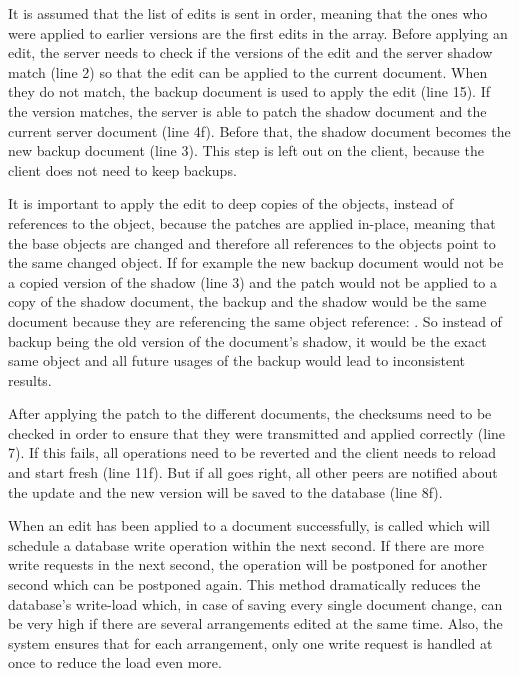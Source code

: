 It is assumed that the list of edits is sent in order, meaning that the ones who were applied to earlier versions are the first edits in the array. Before applying an edit, the server needs to check if the versions of the edit and the server shadow match (line 2) so that the edit can be applied to the current document. When they do not match, the backup document is used to apply the edit (line 15). If the version matches, the server is able to patch the shadow document and the current server document (line 4f). Before that, the shadow document becomes the new backup document (line 3). This step is left out on the client, because the client does not need to keep backups.

It is important to apply the edit to deep copies of the objects, instead of references to the object, because the patches are applied in-place, meaning that the base objects are changed and therefore all references to the objects point to the same changed object. If for example the new backup document would not be a copied version of the shadow (line 3) and the patch would not be applied to a copy of the shadow document, the backup and the shadow would be the same document because they are referencing the same object reference: . So instead of backup being the old version of the document's shadow, it would be the exact same object and all future usages of the backup would lead to inconsistent results.

After applying the patch to the different documents, the checksums need to be checked in order to ensure that they were transmitted and applied correctly (line 7). If this fails, all operations need to be reverted and the client needs to reload and start fresh (line 11f). But if all goes right, all other peers are notified about the update and the new version will be saved to the database (line 8f).

When an edit has been applied to a document successfully,  is called which will schedule a database write operation within the next second. If there are more write requests in the next second, the operation will be postponed for another second which can be postponed again. This method dramatically reduces the database's write-load which, in case of saving every single document change, can be very high if there are several arrangements edited at the same time. Also, the system ensures that for each arrangement, only one write request is handled at once to reduce the load even more.

